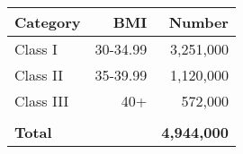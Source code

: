 \bgroup
\def\arraystretch{1.2}
\begin{tabular}{lrr}
\toprule
\textbf{Category} & \textbf{BMI\phantom{+}} & \textbf{Number} \\ 
\midrule
Class I & 30-34.99\phantom{+} & 3,251,000 \\
Class II & 35-39.99\phantom{+} & 1,120,000 \\
Class III & 40+ & 572,000 \\
 & \\[-10pt] 
\textbf{Total} & & \textbf{4,944,000} \\
\bottomrule
\end{tabular}
\egroup